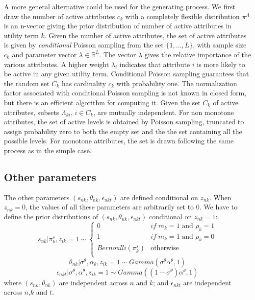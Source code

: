 \documentclass[12pt]{article}
\newcounter{thm}[section]
\begin{document}
A more general alternative could be used for the generating process. We first draw the number of active attributes $c_k$ with a completely flexible distribution $\pi^\Lambda$ is an n-vector giving the prior distribution of number of active attributes in utility term $k$. Given the number of active attributes, the set of active attributes is given by {\em conditional} Poisson sampling from the set $\{1,\ldots,L\}$, with sample size $c_{k}$ and parameter vector $\lambda \in \mathbb{R}^L$.
The vector $\lambda$ gives the relative importance of the various attributes.
A higher weight $\lambda_i$ indicates that attribute $i$ is more likely to be active in any given utility term.
Conditional Poisson sampling guarantees that the random set $C_{k}$ has cardinality $c_{k}$ with probability one.
The normalization factor associated with conditional Poisson sampling is not known in closed form, but there is an efficient algorithm for computing it.
Given the set $C_{k}$ of active attributes, subsets $\Lambda_{ki}$, $i \in C_{k}$, are mutually independent.
For non monotone attributes, the set of active levels is obtained by Poisson sampling, truncated to assign probability zero to both the empty set and the the set containing all the possible levels. For monotone attributes, the set is drawn following the same process as in the simple case.

\subsection{Other parameters}

The other parameters $(s_{nk},\theta_{nk},\epsilon_{nkt})$ are defined conditional on $z_{nk}$. When $z_{nk}=0$, the values of all these parameters are arbitrarily set to $0$. We have to define the prior distributions of $(s_{nk},\theta_{nk},\epsilon_{nkt})$ conditional on $z_{nk}=1$:
$$ s_{nk}|\pi_k^s,z_{ik}=1 \sim \left\{ \begin{array}{cl}
0 & if \; m_k=1 \text{ and } \rho_k=1\\
1 & if \; m_k=1 \text{ and } \rho_k=0\\
Bernoulli(\pi_k^s) & \text{otherwise}\\
\end{array}\right.$$
$$ \theta_{nk}|\sigma^\theta,\alpha_\theta,z_{ik}=1 \sim Gamma(\sigma^\theta \alpha^\theta,1) $$
$$ \epsilon_{nkt}|\sigma^\theta,\alpha^\theta,z_{ik}=1 \sim Gamma((1-\sigma^\theta)\alpha^\theta,1) $$
where $(s_{nk},\theta_{nk})$ are independent across $n$ and $k$; and $\epsilon_{nkt}$ are independent across $n$,$k$ and $t$.
\end{document}
